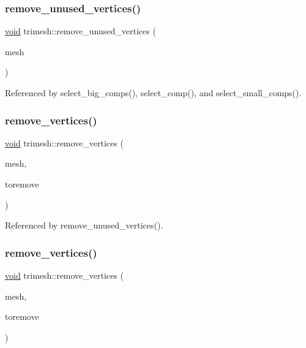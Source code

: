\subsubsection{\texorpdfstring{remove\+\_\+unused\+\_\+vertices()}{remove\_unused\_vertices()}}
{\footnotesize\ttfamily \hyperlink{namespacetrimesh_a784ddfd979e1c579bda795a8edfc3f43}{void} trimesh\+::remove\+\_\+unused\+\_\+vertices (\begin{DoxyParamCaption}\item[{\hyperlink{classtrimesh_1_1TriMesh}{Tri\+Mesh} $\ast$}]{mesh }\end{DoxyParamCaption})}



Referenced by select\+\_\+big\+\_\+comps(), select\+\_\+comp(), and select\+\_\+small\+\_\+comps().

\mbox{\label{namespacetrimesh_a84aeaf44b09ef93b6d49140b9d307ee8}} 
\subsubsection{\texorpdfstring{remove\+\_\+vertices()}{remove\_vertices()}\hspace{0.1cm}{\footnotesize\ttfamily [1/2]}}
{\footnotesize\ttfamily \hyperlink{namespacetrimesh_a784ddfd979e1c579bda795a8edfc3f43}{void} trimesh\+::remove\+\_\+vertices (\begin{DoxyParamCaption}\item[{\hyperlink{classtrimesh_1_1TriMesh}{Tri\+Mesh} $\ast$}]{mesh,  }\item[{const vector$<$ bool $>$ \&}]{toremove }\end{DoxyParamCaption})}



Referenced by remove\+\_\+unused\+\_\+vertices().

\mbox{\label{namespacetrimesh_a0fcaeb83417f32b5128881cb1076e7de}} 
\subsubsection{\texorpdfstring{remove\+\_\+vertices()}{remove\_vertices()}\hspace{0.1cm}{\footnotesize\ttfamily [2/2]}}
{\footnotesize\ttfamily \hyperlink{namespacetrimesh_a784ddfd979e1c579bda795a8edfc3f43}{void} trimesh\+::remove\+\_\+vertices (\begin{DoxyParamCaption}\item[{\hyperlink{classtrimesh_1_1TriMesh}{Tri\+Mesh} $\ast$}]{mesh,  }\item[{const \+::std\+::vector$<$ bool $>$ \&}]{toremove }\end{DoxyParamCaption})}



